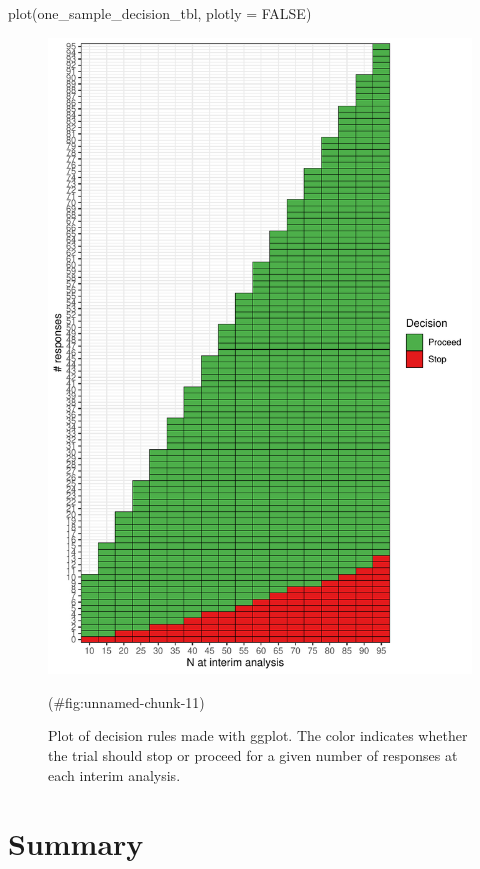 \begin{Schunk}
\begin{Sinput}
plot(one_sample_decision_tbl, plotly = FALSE)
\end{Sinput}
\begin{figure}
\includegraphics{zabor-hobbs-kane_files/figure-latex/unnamed-chunk-11-1} \caption[Plot of decision rules made with ggplot]{Plot of decision rules made with ggplot. The color indicates whether the trial should stop or proceed for a given number of responses at each interim analysis.}(\#fig:unnamed-chunk-11)
\end{figure}
\end{Schunk}

\hypertarget{summary}{%
\section{Summary}\label{summary}}

